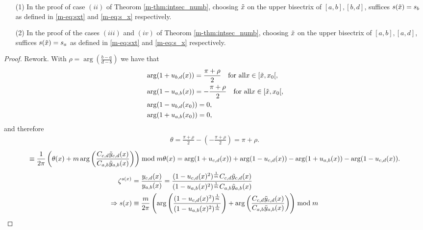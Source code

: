 \documentclass[main.tex]{subfiles}
\begin{document}
\begin{lemma}\label{lemma:sxt=sx}
  \begin{itemize}
   \item[(1)] In the proof of case $(ii)$ of Theorom \ref{m-thm:intsec_numb}, choosing $\tilde{x}$ on the upper bisectrix
   of $[a,b],[b,d]$, suffices $s(\tilde{x}) = s_b$ as defined in \eqref{m-eq:sxt} and \eqref{m-eq:s_x} respectively.
    \item[(2)] In the proof of the cases $(iii)$ and $(iv)$ of Theorom \ref{m-thm:intsec_numb}, choosing $\tilde{x}$ on the upper bisectrix
   of $[a,b],[a,d]$, suffices $s(\tilde{x}) = s_a$ as defined in \eqref{m-eq:sxt} and \eqref{m-eq:s_x} respectively.
  \end{itemize}
\end{lemma}
 \begin{proof}
 \todo Rework.
  With $\rho = \arg\left(\frac{b-a}{d-b}\right)$ we have that
  \begin{align*}
   & \arg (1+u_{b,d}(x)) = \frac{\pi+\rho}{2} \quad \text{for all}  x \in [\tilde{x},x_0[,\\
   & \arg (1-u_{a,b}(x)) = -\frac{\pi+\rho}{2} \quad \text{for all}  x \in [\tilde{x},x_0[,\\
   & \arg (1-u_{b,d}(x_0)) = 0,\\
   & \arg (1+u_{a,b}(x_0))= 0,
  \end{align*}
  and therefore
  \begin{align*}
   \theta = \frac{\pi+\rho}{2} - \left(-\frac{\pi+\rho}{2}\right) = \pi + \rho.
  \end{align*}
  \begin{equation}
   \equiv \frac{1}{2\pi}\left( \theta(x) + m \arg \left( \frac{ C_{c,d} \tilde{y}_{c,d}(x)}{ C_{a,b}
   \tilde{y}_{a,b}(x)} \right) \right) \bmod m
   \theta(x) = \arg(1+u_{c,d}(x)) + \arg(1-u_{c,d}(x)) - \arg(1+u_{a,b}(x)) - \arg(1-u_{c,d}(x)).
  \end{equation}
    \begin{align}\label{eq:s(x)2}
  \begin{split}
   \zeta^{s(x)} & = \frac{y_{c,d}(x)}{y_{a,b}(x)} = \frac{(1- u_{c,d}(x)^2)^{\frac{1}{m}} C_{c,d} \tilde{y}_{c,d}(x) }{(1-u_{a,b}(x)^2)^{\frac{1}{m}} C_{a,b} \tilde{y}_{a,b}(x)} \\
   \Rightarrow  s(x) & \equiv \frac{m}{2\pi} \left( \arg \left( \frac{(1- u_{c,d}(x)^2)^{\frac{1}{m}}}{(1-u_{a,b}(x)^2)^{\frac{1}{m}}} \right) + \arg \left( \frac{ C_{c,d} \tilde{y}_{c,d}(x)}{ C_{a,b}
   \tilde{y}_{a,b}(x)} \right) \right) \bmod m
  \end{split}
  \end{align}
 \end{proof}
\end{document}
